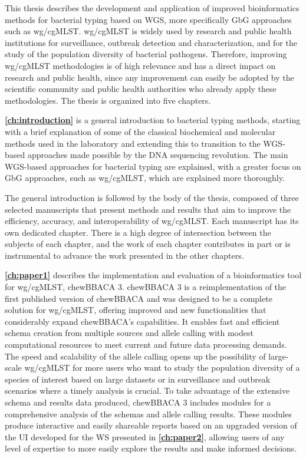 


This thesis describes the development and application of improved bioinformatics methods for bacterial typing based on \ac{WGS}, more specifically \ac{GbG} approaches such as \ac{wg/cgMLST}. \ac{wg/cgMLST} is widely used by research and public health institutions for surveillance, outbreak detection and characterization, and for the study of the population diversity of bacterial pathogens. Therefore, improving \ac{wg/cgMLST} methodologies is of high relevance and has a direct impact on research and public health, since any improvement can easily be adopted by the scientific community and public health authorities who already apply these methodologies. The thesis is organized into five chapters.

\textbf{\autoref{ch:introduction}} is a general introduction to bacterial typing methods, starting with a brief explanation of some of the classical biochemical and molecular methods used in the laboratory and extending this to transition to the \ac{WGS}-based approaches made possible by the DNA sequencing revolution. The main WGS-based approaches for bacterial typing are explained, with a greater focus on \ac{GbG} approaches, such as \ac{wg/cgMLST}, which are explained more thoroughly.

The general introduction is followed by the body of the thesis, composed of three selected manuscripts that present methods and results that aim to improve the efficiency, accuracy, and interoperability of \ac{wg/cgMLST}. Each manuscript has its own dedicated chapter. There is a high degree of intersection between the subjects of each chapter, and the work of each chapter contributes in part or is instrumental to advance the work presented in the other chapters.

\textbf{\autoref{ch:paper1}} describes the implementation and evaluation of a bioinformatics tool for \ac{wg/cgMLST}, chewBBACA 3. chewBBACA 3 is a reimplementation of the first published version of chewBBACA and was designed to be a complete solution for \ac{wg/cgMLST}, offering improved and new functionalities that considerably expand chewBBACA's capabilities. It enables fast and efficient schema creation from multiple sources and allele calling with modest computational resources to meet current and future data processing demands. The speed and scalability of the allele calling opens up the possibility of large-scale \ac{wg/cgMLST} for more users who want to study the population diversity of a species of interest based on large datasets or in surveillance and outbreak scenarios where a timely analysis is crucial. To take advantage of the extensive schema and results data produced, chewBBACA 3 includes modules for a comprehensive analysis of the schemas and allele calling results. These modules produce interactive and easily shareable reports based on an upgraded version of the \ac{UI} developed for the \ac{WS} presented in \textbf{\autoref{ch:paper2}}, allowing users of any level of expertise to more easily explore the results and make informed decisions.

